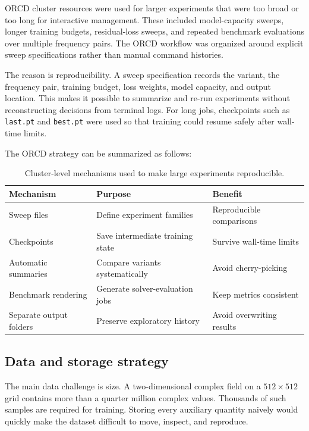 ORCD cluster resources were used for larger experiments that were too broad
or too long for interactive management. These included model-capacity sweeps,
longer training budgets, residual-loss sweeps, and repeated benchmark
evaluations over multiple frequency pairs. The ORCD workflow was organized
around explicit sweep specifications rather than manual command histories.

The reason is reproducibility. A sweep specification records the variant, the
frequency pair, training budget, loss weights, model capacity, and output
location. This makes it possible to summarize and re-run experiments without
reconstructing decisions from terminal logs. For long jobs, checkpoints such
as \texttt{last.pt} and \texttt{best.pt} were used so that training could
resume safely after wall-time limits.

The ORCD strategy can be summarized as follows:
\begin{table}[h]
\centering
\begin{tabular}{lll}
\toprule
Mechanism & Purpose & Benefit \\
\midrule
Sweep files & Define experiment families & Reproducible comparisons \\
Checkpoints & Save intermediate training state & Survive wall-time limits \\
Automatic summaries & Compare variants systematically & Avoid cherry-picking \\
Benchmark rendering & Generate solver-evaluation jobs & Keep metrics consistent \\
Separate output folders & Preserve exploratory history & Avoid overwriting results \\
\bottomrule
\end{tabular}
\caption{Cluster-level mechanisms used to make large experiments reproducible.}
\label{tab:computational_orcd_mechanisms}
\end{table}


\subsection{Data and storage strategy}
\label{subsec:computational_storage}

The main data challenge is size. A two-dimensional complex field on a
$512 \times 512$ grid contains more than a quarter million complex values.
Thousands of such samples are required for training. Storing every auxiliary
quantity naively would quickly make the dataset difficult to move, inspect,
and reproduce.

